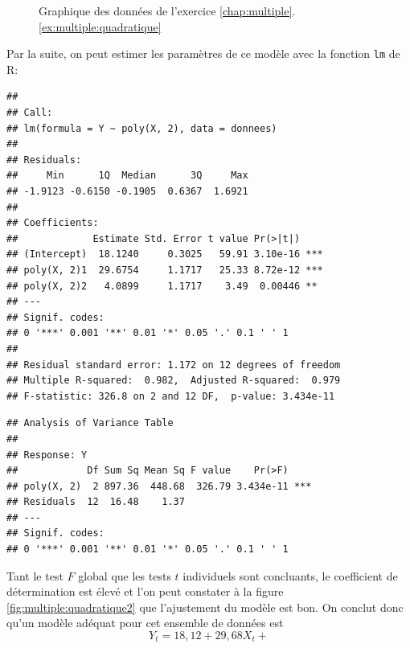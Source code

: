 \begin{solution}{3.16}
\begin{figure}
\begin{knitrout}
\end{knitrout}
      \caption{Graphique des données de l'exercice
        \ref{chap:multiple}.\ref{ex:multiple:quadratique}}
      \label{fig:multiple:quadratique}
    \end{figure}
    Par la suite, on peut estimer les paramètres de ce modèle avec la
    fonction \texttt{lm} de \textsf{R}:
\begin{knitrout}
\color{fgcolor}\begin{kframe}
\begin{alltt}
 \hlkwb{<-}  \hlopt{~}  \hlstd{),}  
\end{alltt}
\begin{verbatim}
##
## Call:
## lm(formula = Y ~ poly(X, 2), data = donnees)
##
## Residuals:
##     Min      1Q  Median      3Q     Max
## -1.9123 -0.6150 -0.1905  0.6367  1.6921
##
## Coefficients:
##             Estimate Std. Error t value Pr(>|t|)
## (Intercept)  18.1240     0.3025   59.91 3.10e-16 ***
## poly(X, 2)1  29.6754     1.1717   25.33 8.72e-12 ***
## poly(X, 2)2   4.0899     1.1717    3.49  0.00446 **
## ---
## Signif. codes:
## 0 '***' 0.001 '**' 0.01 '*' 0.05 '.' 0.1 ' ' 1
##
## Residual standard error: 1.172 on 12 degrees of freedom
## Multiple R-squared:  0.982,	Adjusted R-squared:  0.979
## F-statistic: 326.8 on 2 and 12 DF,  p-value: 3.434e-11
\end{verbatim}
\begin{alltt}
\end{alltt}
\begin{verbatim}
## Analysis of Variance Table
##
## Response: Y
##            Df Sum Sq Mean Sq F value    Pr(>F)
## poly(X, 2)  2 897.36  448.68  326.79 3.434e-11 ***
## Residuals  12  16.48    1.37
## ---
## Signif. codes:
## 0 '***' 0.001 '**' 0.01 '*' 0.05 '.' 0.1 ' ' 1
\end{verbatim}
\end{kframe}
\end{knitrout}
    Tant le test $F$ global que les tests $t$ individuels sont
    concluants, le coefficient de détermination est élevé et l'on peut
    constater à la figure \ref{fig:multiple:quadratique2} que
    l'ajustement du modèle est bon. On conclut donc qu'un modèle
    adéquat pour cet ensemble de données est
    \begin{displaymath}
      Y_t = 18,12 +
      29,68 X_t +

\end{displaymath}
\end{solution}
